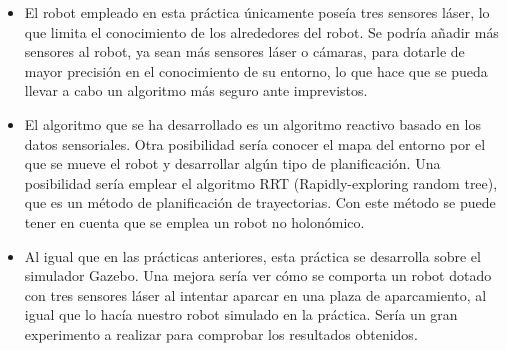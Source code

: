 \begin{itemize}
\item El robot empleado en esta práctica únicamente poseía tres sensores láser, lo que limita el conocimiento de los alrededores del robot. Se podría añadir más sensores al robot, ya sean más sensores láser o cámaras, para dotarle de mayor precisión en el conocimiento de su entorno, lo que hace que se pueda llevar a cabo un algoritmo más seguro ante imprevistos.
\item El algoritmo que se ha desarrollado es un algoritmo reactivo basado en los datos sensoriales. Otra posibilidad sería conocer el mapa del entorno por el que se mueve el robot y desarrollar algún tipo de planificación. Una posibilidad sería emplear el algoritmo RRT (Rapidly-exploring random tree), que es un método de planificación de trayectorias. Con este método se puede tener en cuenta que se emplea un robot no holonómico.
\item Al igual que en las prácticas anteriores, esta práctica se desarrolla sobre el simulador Gazebo. Una mejora sería ver cómo se comporta un robot dotado con tres sensores láser al intentar aparcar en una plaza de aparcamiento, al igual que lo hacía nuestro robot simulado en la práctica. Sería un gran experimento a realizar para comprobar los resultados obtenidos.
\end{itemize}

